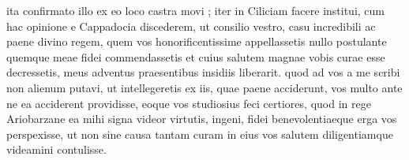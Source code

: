  ita confirmato illo ex eo loco castra movi ; iter in Ciliciam facere institui, cum hac opinione e Cappadocia discederem, ut consilio vestro, casu incredibili ac paene divino regem, quem vos honorificentissime appellassetis nullo postulante quemque meae fidei commendassetis et cuius salutem magnae vobis curae esse decressetis, meus adventus praesentibus insidiis liberarit. quod ad vos a me scribi non alienum putavi, ut intellegeretis ex iis, quae paene acciderunt, vos multo ante ne ea acciderent providisse, eoque vos studiosius feci certiores, quod in rege Ariobarzane ea mihi signa videor virtutis, ingeni, fidei benevolentiaeque erga vos perspexisse, ut non sine causa tantam curam in eius vos salutem diligentiamque videamini contulisse.
